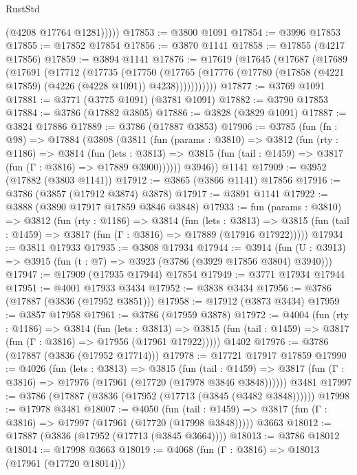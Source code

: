 \begin{lexlean}{RustStd}
\begin{coremodule}
            (@4208 @17764 @1281)))))
@17853 := @3800 @1091
@17854 := @3996 @17853
@17855 := @17852 @17854
@17856 := @3870 @1141
@17858 := @17855 (@4217 @17856)
@17859 := @3894 @1141
@17876 := @17619
    (@17645
      (@17687
        (@17689
          (@17691
            (@17712
              (@17735
                (@17750
                  (@17765
                    (@17776 (@17780 (@17858 (@4221 @17859) (@4226 (@4228 @1091)) @4238)))))))))))
@17877 := @3769 @1091
@17881 := @3771 (@3775 @1091) (@3781 @1091)
@17882 := @3790 @17853
@17884 := @3786 (@17882 @3805)
@17886 := @3828 (@3829 @1091)
@17887 := @3824 @17886
@17889 := @3786 (@17887 @3853)
@17906 := @3785
    (fun (fn : @98) =>
    @17884
      (@3808
        (@3811
          (fun (params : @3810) =>
          @3812
            (fun (rty : @1186) =>
            @3814
              (fun (lets : @3813) =>
              @3815 (fun (tail : @1459) => @3817 (fun (Γ : @3816) => @17889 @3900))))))
        @3946))
    @1141
@17909 := @3952 (@17882 (@3803 @1141))
@17912 := @3865 (@3866 @1141) @17856
@17916 := @3786 (@3857 (@17912 @3874) @3878)
@17917 := @3891 @1141
@17922 := @3888 (@3890 @17917 @17859 @3846 @3848)
@17933 := fun (params : @3810) =>
  @3812
    (fun (rty : @1186) =>
    @3814
      (fun (lets : @3813) =>
      @3815 (fun (tail : @1459) => @3817 (fun (Γ : @3816) => @17889 (@17916 @17922)))))
@17934 := @3811 @17933
@17935 := @3808 @17934
@17944 := @3914
    (fun (U : @3913) => @3915 (fun (t : @7) => @3923 (@3786 (@3929 @17856 @3804) @3940)))
@17947 := @17909 (@17935 @17944) @17854
@17949 := @3771 @17934 @17944
@17951 := @4001 @17933 @3434
@17952 := @3838 @3434
@17956 := @3786 (@17887 (@3836 (@17952 @3851)))
@17958 := @17912 (@3873 @3434)
@17959 := @3857 @17958
@17961 := @3786 (@17959 @3878)
@17972 := @4004
    (fun (rty : @1186) =>
    @3814
      (fun (lets : @3813) =>
      @3815 (fun (tail : @1459) => @3817 (fun (Γ : @3816) => @17956 (@17961 @17922)))))
    @1402
@17976 := @3786 (@17887 (@3836 (@17952 @17714)))
@17978 := @17721 @17917 @17859
@17990 := @4026
    (fun (lets : @3813) =>
    @3815
      (fun (tail : @1459) =>
      @3817 (fun (Γ : @3816) => @17976 (@17961 (@17720 (@17978 @3846 @3848))))))
    @3481
@17997 := @3786 (@17887 (@3836 (@17952 (@17713 (@3845 (@3482 @3848))))))
@17998 := @17978 @3481
@18007 := @4050
    (fun (tail : @1459) => @3817 (fun (Γ : @3816) => @17997 (@17961 (@17720 (@17998 @3848)))))
    @3663
@18012 := @17887 (@3836 (@17952 (@17713 (@3845 @3664))))
@18013 := @3786 @18012
@18014 := @17998 @3663
@18019 := @4068 (fun (Γ : @3816) => @18013 (@17961 (@17720 @18014)))

\end{coremodule}
\end{lexlean}
